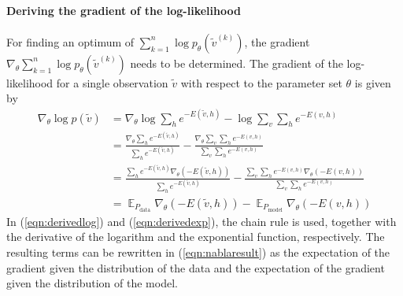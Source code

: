 \documentclass[12pt]{article}
\DeclareMathOperator{\EX}{\mathbb{E}}
\begin{document}
\paragraph{Deriving the gradient of the log-likelihood}

For finding an optimum of $\sum_{k=1}^{n}  \log p_\theta(\tilde{v}^{(k)})$, the gradient $\nabla_\theta \sum_{k=1}^{n}  \log p_\theta(\tilde{v}^{(k)})$ needs to be determined.
The gradient of the log-likelihood for a single observation
$\tilde{v} $ with respect to the parameter set $\theta$ is given by
\begin{align}
\nabla_{\!\theta}  \log p(\tilde{v}) &= \nabla_{\!\theta}   \log \sum_h e^{-E(\tilde{v}, h)} - \log \sum_v \sum_h e^{-E(v, h)} \nonumber \\
 &= \frac{\nabla_{\!\theta} \sum_h e^{-E(\tilde{v}, h)}}{\sum_h e ^{-E(\tilde{v}, h)}} - \frac{\nabla_{\!\theta} \sum_v \sum_h e^{-E(v,h)}}{\sum_v \sum_h e^{-E(v,h)}} \label{eqn:derivedlog}\\
&=  \frac{\sum_h e^{-E(\tilde{v}, h)} \nabla_{\!\theta} (-E(\tilde{v}, h))} {\sum_h e^{-E(\tilde{v}, h)}} - \frac{\sum_v \sum_h e^{-E(v, h)} \nabla_{\!\theta} (-E(v, h))}{\sum_v \sum_h e^{-E(v, h)}} \label{eqn:derivedexp}\\
&=  \EX_{P_\text{data}} \nabla_{\!\theta} (- E(\tilde{v},h)) - \EX_{P_\text{model}} \nabla_{\!\theta} (-E(v,h)) \label{eqn:nablaresult}
\end{align}
In (\ref{eqn:derivedlog}) and (\ref{eqn:derivedexp}), the chain rule is used, together with the derivative of the logarithm and the exponential function, respectively. The resulting terms can be rewritten in (\ref{eqn:nablaresult}) as the expectation of the gradient given the distribution of the data and the expectation of the gradient given the distribution of the model.
\end{document}

